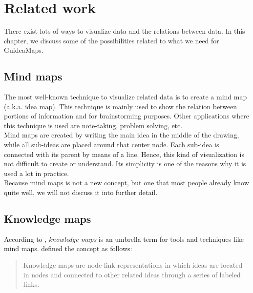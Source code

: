 \chapter{Related work}\label{ch:related-work}

There exist lots of ways to visualize data and the relations between data. In this chapter, we discuss some of the possibilities related to what we need for GuideaMaps.

\section{Mind maps}
The most well-known technique to visualize related data is to create a mind map (a.k.a. idea map). This technique is mainly used to show the relation between portions of information and for brainstorming purposes. Other applications where this technique is used are note-taking, problem solving, etc. \citep{knowledgemapsbalaid} \\

Mind maps are created by writing the main idea in the middle of the drawing, while all sub-ideas are placed around that center node. Each sub-idea is connected with its parent by means of a line. Hence, this kind of visualization is not difficult to create or understand. Its simplicity is one of the reasons why it is used a lot in practice.\\

Because mind maps is not a new concept, but one that most people already know quite well, we will not discuss it into further detail.





\section{Knowledge maps}
According to \cite{knowledgemapsbalaid}, \textit{knowledge maps} is an umbrella term for tools and techniques like mind maps. \cite{knowledgemapsodonnell} defined the concept as follows:

\begin{quote}
Knowledge maps are node-link representations in which ideas are located in nodes and connected to other related ideas through a series of labeled links. \hfill 
\end{quote}

